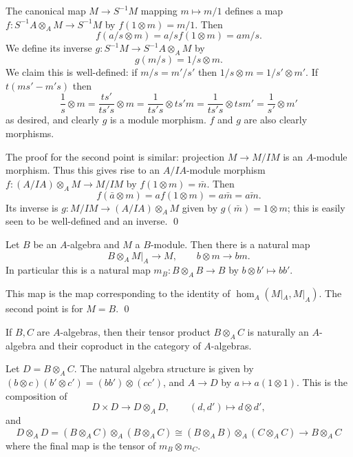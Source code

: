 \eprop

\bproof

    The canonical map $M\to S^{-1}M$ mapping $m\mapsto m/1$ defines a map $f\colon S^{-1}A\otimes_AM\to S^{-1}M$ by
    $f(1\otimes m)=m/1$.
    Then
    $$ f(a/s\otimes m) = a/sf(1\otimes m) = am/s . $$
    We define its inverse $g\colon S^{-1}M\to S^{-1}A\otimes_AM$ by
    $$ g(m/s) = 1/s\otimes m . $$
    We claim this is well-defined: if $m/s=m'/s'$ then $1/s\otimes m=1/s'\otimes m'$.
    If $t(ms'-m's)$ then
    $$ \frac1s\otimes m = \frac{ts'}{ts's}\otimes m = \frac1{ts's}\otimes ts'm = \frac1{ts's}\otimes tsm' = \frac1{s'}\otimes m' $$
    as desired, and clearly $g$ is a module morphism.
    $f$ and $g$ are also clearly morphisms.

    The proof for the second point is similar: projection $M\to M/IM$ is an $A$-module morphism.
    Thus this gives rise to an $A/IA$-module morphism $f\colon(A/IA)\otimes_AM\to M/IM$ by $f(1\otimes m)=\bar m$.
    Then
    $$ f(\bar a\otimes m) = af(1\otimes m) = a\bar m = \bar{am} . $$
    Its inverse is $g\colon M/IM\to(A/IA)\otimes_AM$ given by $g(\bar m)=1\otimes m$; this is easily seen to be well-defined and an inverse.
    \qed

\eproof

\bcoro

    Let $B$ be an $A$-algebra and $M$ a $B$-module.
    Then there is a natural map
    $$ B\otimes_A M|_A \to M,\qquad b\otimes m\to bm . $$
    In particular this is a natural map $m_B\colon B\otimes_AB\to B$ by $b\otimes b'\mapsto bb'$.

\ecoro

\bproof

    This map is the map corresponding to the identity of $\hom_A(M|_A,M|_A)$.
    The second point is for $M=B$.
    \qed

\eproof

\blemm

    If $B,C$ are $A$-algebras, then their tensor product $B\otimes_AC$ is naturally an $A$-algebra and their coproduct in the category of
    $A$-algebras.

\elemm

\bproof

    Let $D=B\otimes_AC$.
    The natural algebra structure is given by $(b\otimes c)(b'\otimes c')=(bb')\otimes(cc')$, and $A\to D$ by $a\mapsto a(1\otimes 1)$.
    This is the composition of
    $$ D\times D\to D\otimes_AD,\qquad (d,d')\mapsto d\otimes d', $$
    and
    $$ D\otimes_AD = (B\otimes_AC)\otimes_A(B\otimes_AC) \cong (B\otimes_AB)\otimes_A(C\otimes_AC) \to B\otimes_AC $$
    where the final map is the tensor of $m_B\otimes m_C$.

